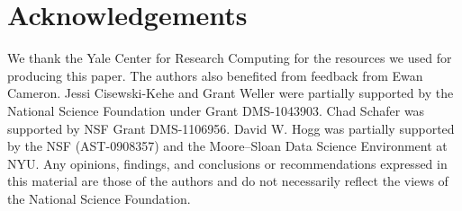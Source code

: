 \documentclass[ejs]{imsart}
\numberwithin{equation}{section}
\theoremstyle{plain}
\begin{document}
%
%
%
%

\section*{Acknowledgements}
We thank the Yale Center for Research Computing for the resources we used for producing this paper.
The authors also benefited from feedback from Ewan Cameron.  
Jessi Cisewski-Kehe and Grant Weller were partially supported by the National Science Foundation under Grant DMS-1043903. 
Chad Schafer was supported by NSF Grant DMS-1106956.  David W. Hogg was partially supported by the NSF (AST-0908357) and the Moore--Sloan Data Science Environment at NYU.
Any opinions, findings, and conclusions or recommendations expressed in this material are those of the authors and do not necessarily reflect the views of the National Science Foundation.








\end{document}
